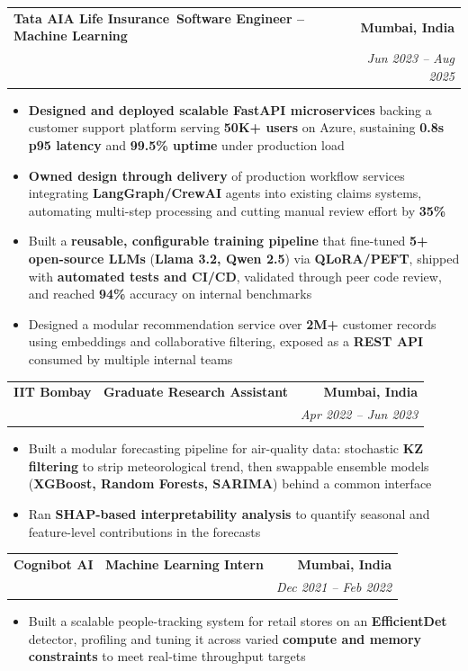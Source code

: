 \documentclass[letterpaper,11pt]{article}
\makeatletter
\newcommand{\tagbullet}{\textcolor{mygray}{\textbullet}\,}
\newcommand{\skill}[1]{\blogtag{\scriptsize \tagbullet \MakeUppercase{#1}}}
\newcommand{\resumeItem}[1]{
  \item\small{
    {#1 \vspace{-6pt}}
  }
}
\newcommand{\resumeSubheading}[4]{
  \vspace{-2pt}\item
    \begin{tabular*}{1.0\textwidth}[t]{l@{\extracolsep{\fill}}r}
      \textbf{#1} & \textbf{\small #2} \\
      \textit{\small#3} & \textit{\small #4} \\
    \end{tabular*}\vspace{-8pt}
}
\newcommand{\resumeItemListStart}{\begin{itemize}}
\newcommand{\resumeItemListEnd}{\end{itemize}\vspace{-6pt}}
\makeatother
\begin{document}
    \resumeSubheading
  {Tata AIA Life Insurance\textbar\ Software Engineer -- Machine Learning}{Mumbai, India}
  {\small \skill{Python}\,\skill{FastAPI}\,\skill{REST APIs}\,\skill{Microservices}\,\skill{Docker}\,\skill{Kubernetes}\,\skill{Azure}\,\skill{CI/CD}}{Jun 2023 -- Aug 2025}
  \resumeItemListStart
    \resumeItem{\textbf{Designed and deployed scalable FastAPI microservices} backing a customer support platform serving \textbf{50K+ users} on Azure, sustaining \textbf{0.8s p95 latency} and \textbf{99.5\% uptime} under production load}
    \resumeItem{\textbf{Owned design through delivery} of production workflow services integrating \textbf{LangGraph/CrewAI} agents into existing claims systems, automating multi-step processing and cutting manual review effort by \textbf{35\%}}
    \resumeItem{Built a \textbf{reusable, configurable training pipeline} that fine-tuned \textbf{5+ open-source LLMs} (\textbf{Llama 3.2, Qwen 2.5}) via \textbf{QLoRA/PEFT}, shipped with \textbf{automated tests and CI/CD}, validated through peer code review, and reached \textbf{94\%} accuracy on internal benchmarks}
    \resumeItem{Designed a modular recommendation service over \textbf{2M+} customer records using embeddings and collaborative filtering, exposed as a \textbf{REST API} consumed by multiple internal teams}
  \resumeItemListEnd

    \resumeSubheading
  {IIT Bombay \textbar\ Graduate Research Assistant}{Mumbai, India}
  {\small \skill{Python}\,\skill{Data Pipelines}\,\skill{Pandas}\,\skill{NumPy}\,\skill{Time Series}}{Apr 2022 -- Jun 2023}
  \resumeItemListStart
    \resumeItem{Built a modular forecasting pipeline for air-quality data: stochastic \textbf{KZ filtering} to strip meteorological trend, then swappable ensemble models (\textbf{XGBoost, Random Forests, SARIMA}) behind a common interface}
    \resumeItem{Ran \textbf{SHAP-based interpretability analysis} to quantify seasonal and feature-level contributions in the forecasts}
  \resumeItemListEnd

    \resumeSubheading
     {Cognibot AI \textbar\ Machine Learning Intern}{Mumbai, India}
     {\small \skill{Computer Vision}\,\skill{Object Detection}\,\skill{EfficientDet}\,\skill{Python}}{Dec 2021 -- Feb 2022}
    \resumeItemListStart
      \resumeItem{Built a scalable people-tracking system for retail stores on an \textbf{EfficientDet} detector, profiling and tuning it across varied \textbf{compute and memory constraints} to meet real-time throughput targets}
    \resumeItemListEnd
\end{document}
